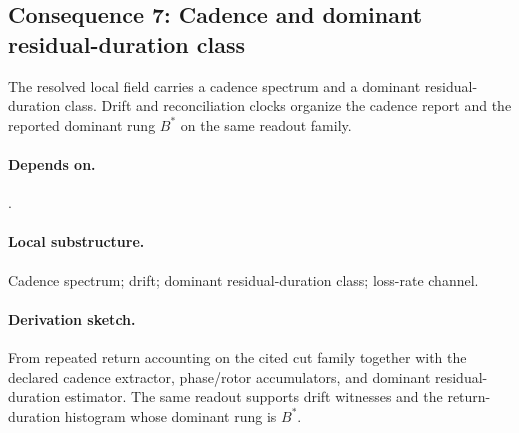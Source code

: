 \subsection{Consequence 7: Cadence and dominant residual-duration class}
\begin{consequence}\label{cons:c7}
The resolved local field carries a cadence spectrum and a dominant residual-duration class. Drift and reconciliation clocks organize the cadence report and the reported dominant rung $B^*$ on the same readout family.
\end{consequence}
\paragraph{Depends on.} .
\paragraph{Local substructure.} Cadence spectrum; drift; dominant residual-duration class; loss-rate channel.
\paragraph{Derivation sketch.} From repeated return accounting on the cited cut family together with the declared cadence extractor, phase/rotor accumulators, and dominant residual-duration estimator. The same readout supports drift witnesses and the return-duration histogram whose dominant rung is $B^*$.
